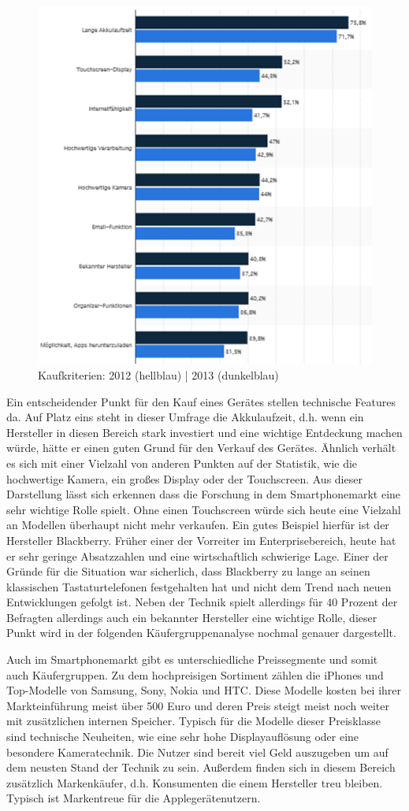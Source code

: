 \begin{figure}[H]
\centering
\includegraphics[width=0.7\linewidth]{../images/statista2.png}
\caption{Kaufkriterien: 2012 (hellblau) | 2013 (dunkelblau)}
\label{fig:stat2}
\end{figure}


Ein entscheidender Punkt für den Kauf eines Gerätes stellen technische Features da. Auf Platz eins steht in dieser Umfrage die Akkulaufzeit, d.h. wenn ein Hersteller in diesen Bereich stark investiert und eine wichtige Entdeckung machen würde, hätte er einen guten Grund für den Verkauf des Gerätes. Ähnlich verhält es sich mit einer Vielzahl von anderen Punkten auf der Statistik, wie die hochwertige Kamera, ein großes Display oder der Touchscreen. Aus dieser Darstellung lässt sich erkennen dass die Forschung in dem Smartphonemarkt eine sehr wichtige Rolle spielt. Ohne einen Touchscreen würde sich heute eine Vielzahl an Modellen überhaupt nicht mehr verkaufen. Ein gutes Beispiel hierfür ist der Hersteller Blackberry. Früher einer der Vorreiter  im Enterprisebereich, heute hat er  sehr geringe Absatzzahlen und eine wirtschaftlich schwierige Lage. Einer der Gründe für die Situation war sicherlich, dass Blackberry zu lange an seinen klassischen Tastaturtelefonen festgehalten hat und nicht dem Trend nach neuen Entwicklungen gefolgt ist. Neben der Technik  spielt allerdings für 40 Prozent der Befragten allerdings auch ein bekannter Hersteller eine wichtige Rolle, dieser Punkt wird in der folgenden Käufergruppenanalyse nochmal genauer dargestellt.

Auch im Smartphonemarkt gibt es unterschiedliche Preissegmente und somit auch Käufergruppen. Zu dem hochpreisigen Sortiment zählen die iPhones und Top-Modelle von Samsung, Sony, Nokia  und HTC. Diese Modelle kosten bei ihrer Markteinführung meist über 500 Euro und deren Preis steigt meist noch weiter mit zusätzlichen internen Speicher. Typisch für die Modelle dieser Preisklasse sind technische Neuheiten, wie eine sehr hohe Displayauflösung oder eine besondere Kameratechnik. Die Nutzer sind bereit viel Geld auszugeben um auf dem neusten Stand der Technik zu sein. Außerdem finden sich in diesem Bereich zusätzlich Markenkäufer, d.h. Konsumenten die einem Hersteller treu bleiben. Typisch ist Markentreue für die Applegerätenutzern. 

